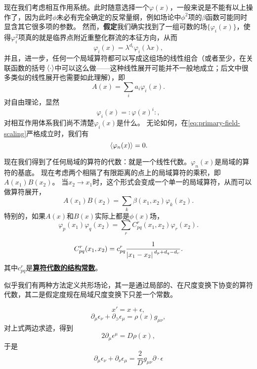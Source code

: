 \documentclass[hyperref, UTF8, a4paper]{ctexart}
\newcommand{\normord}[1]{\vcentcolon\mathrel{#1}\vcentcolon}
\providecommand{\vcentcolon}{\mathrel{\mathop{:}}}
\newcommand{\concept}[1]{\underline{\textbf{#1}}}
\renewcommand{\emph}{\textbf}
\begin{document}
现在我们考虑相互作用系统。此时随意选择一个$\varphi(x)$，一般来说是不能有以上操作了，因为此时$\phi$未必有完全确定的反常量纲，例如场论中$\phi^2$项的$\beta$函数可能同时显含其它很多项的参数。
然而，\emph{假定}我们确实找到了一组可数的场$\{\varphi_i(x)\}$，使得$\varphi_i^2$项真的就是临界点附近重整化群流的本征方向，从而
\begin{equation}
    \varphi_i(x) = \lambda^{d_i} \varphi_i(\lambda x),
    \label{eq:primary-field-scaling}
\end{equation}
并且，进一步，任何一个局域算符都可以写成这组场的线性组合（或者至少，在关联函数的括号$\expval*{\cdot}$中可以这么做——这种线性展开可能并不一般地成立；后文中很多类似的线性展开也需要如此理解），即
\begin{equation}
    A(x) = \sum_{i} a_i \varphi_i(x).
\end{equation}
对自由理论，显然
\begin{equation}
    \varphi_i(x) = \normord{\varphi(x)^i},
\end{equation}
对相互作用体系我们尚不清楚$\varphi_i(x)$是什么。
无论如何，在\eqref{eq:primary-field-scaling}严格成立时，我们有
\begin{equation}
    \expval*{\varphi_n(x)} = 0.
\end{equation}

现在我们得到了任何局域的算符的代数：就是一个线性代数。$\varphi_n(x)$是局域的算符的基底。
现在考虑两个相隔了有限距离的点上的局域算符的乘积，即$A(x_1) B(x_2)$。
当$x_2 \to x_1$时，这个形式会变成一个单一的局域算符，从而可以做算符展开，
\begin{equation}
    A(x_1) B(x_2) = \sum_{k} \beta(x_1, x_2) \varphi_k(x_2).
\end{equation}
特别的，如果$A(x)$和$B(x)$实际上都是$\phi(x)$场，
\begin{equation}
    \varphi_p(x_1) \varphi_q(x_2) = \sum_{r} C_{pq}^r(x_1, x_2) \varphi_r(x_2). 
\end{equation}

\begin{equation}
    C_{pq}^r(x_1, x_2) = c_{pq}^r \frac{1}{\abs*{x_1 - x_2}^{d_p + d_q - d_r}}.
\end{equation}
其中$c_{pq}^r$是\concept{算符代数的结构常数}。

似乎我们有两种方法定义共形场论，其一是通过局部的、在尺度变换下协变的算符代数，其二是假定度规在局域尺度变换下只差一个常数。

\begin{equation}
    x' = x + \epsilon,
\end{equation}
\begin{equation}
    \partial_\mu \epsilon_\nu + \partial_\ni \epsilon_\mu = \rho(x) g_{\mu \nu},
\end{equation}
对上式两边求迹，得到
\[
    2 \partial_\mu \epsilon^\mu = D \rho(x),
\]
于是
\begin{equation}
    \partial_\mu \epsilon_\nu + \partial_\nu \epsilon_\mu = \frac{2}{D} g_{\mu \nu} \partial \cdot \epsilon
\end{equation}
\end{document}
